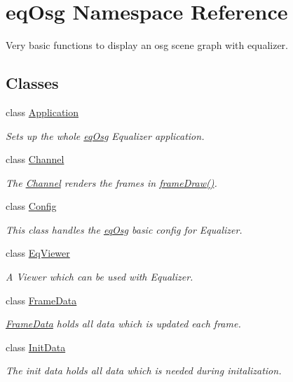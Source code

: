 \hypertarget{a00045}{
\section{eqOsg Namespace Reference}
\label{a00045}
}
Very basic functions to display an osg scene graph with equalizer.  


\subsection*{Classes}
\begin{CompactItemize}
\item 
class \hyperlink{a00001}{Application}
\begin{CompactList}\small\item\em Sets up the whole \hyperlink{a00045}{eqOsg} Equalizer application. \item\end{CompactList}\item 
class \hyperlink{a00002}{Channel}
\begin{CompactList}\small\item\em The \hyperlink{a00002}{Channel} renders the frames in \hyperlink{a00002_70cfd22742da9b9aa3e3478f356ba220}{frameDraw()}. \item\end{CompactList}\item 
class \hyperlink{a00003}{Config}
\begin{CompactList}\small\item\em This class handles the \hyperlink{a00045}{eqOsg} basic config for Equalizer. \item\end{CompactList}\item 
class \hyperlink{a00009}{EqViewer}
\begin{CompactList}\small\item\em A Viewer which can be used with Equalizer. \item\end{CompactList}\item 
class \hyperlink{a00010}{FrameData}
\begin{CompactList}\small\item\em \hyperlink{a00010}{FrameData} holds all data which is updated each frame. \item\end{CompactList}\item 
class \hyperlink{a00011}{InitData}
\begin{CompactList}\small\item\em The init data holds all data which is needed during initalization. \item\end{CompactList}\item 

\end{CompactItemize}
